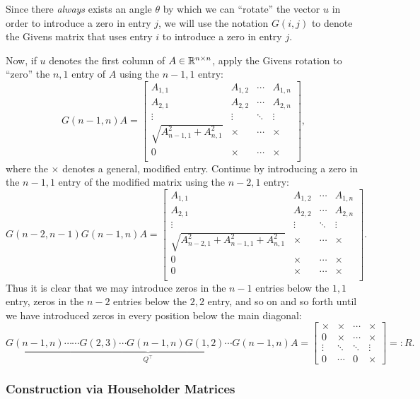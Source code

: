 Since there {\em always} exists an angle $\theta$ by which we can ``rotate'' the vector $u$ in order to introduce a zero in entry $j$, we will use the notation $G(i,j)$ to denote the Givens matrix that uses entry $i$ to introduce a zero in entry $j$.

Now, if $u$ denotes the first column of $A\in\mathbb{R}^{n\times n}$, apply the Givens rotation to ``zero'' the $n,1$ entry of $A$ using the $n-1,1$ entry:
\[
G(n-1,n)A = \begin{bmatrix}
A_{1,1} & A_{1,2} & \cdots & A_{1,n}\\
A_{2,1} & A_{2,2} & \cdots & A_{2,n}\\
\vdots & \vdots & \ddots & \vdots\\
\sqrt{A_{n-1,1}^2+A_{n,1}^2} & \times & \cdots & \times\\
0 & \times & \cdots & \times\\
\end{bmatrix},
\]
where the $\times$ denotes a general, modified entry. Continue by introducing a zero in the $n-1,1$ entry of the modified matrix using the $n-2,1$ entry:
\[
G(n-2,n-1)G(n-1,n)A = \begin{bmatrix}
A_{1,1} & A_{1,2} & \cdots & A_{1,n}\\
A_{2,1} & A_{2,2} & \cdots & A_{2,n}\\
\vdots & \vdots & \ddots & \vdots\\
\sqrt{A_{n-2,1}^2+A_{n-1,1}^2+A_{n,1}^2} & \times & \cdots & \times\\
0 & \times & \cdots & \times\\
0 & \times & \cdots & \times\\
\end{bmatrix}.
\]
Thus it is clear that we may introduce zeros in the $n-1$ entries below the $1,1$ entry, zeros in the $n-2$ entries below the $2,2$ entry, and so on and so forth until we have introduced zeros in every position below the main diagonal:
\[
\underbrace{G(n-1,n)\cdots \cdots G(2,3)\cdots G(n-1,n) G(1,2) \cdots G(n-1,n)}_{Q^\top}A = \begin{bmatrix}
\times & \times & \cdots & \times\\
0 & \times & \cdots & \times\\
\vdots & \ddots & \ddots & \vdots\\
0 & \cdots & 0 & \times
\end{bmatrix} =: R.
\]

\subsubsection{Construction via Householder Matrices}

